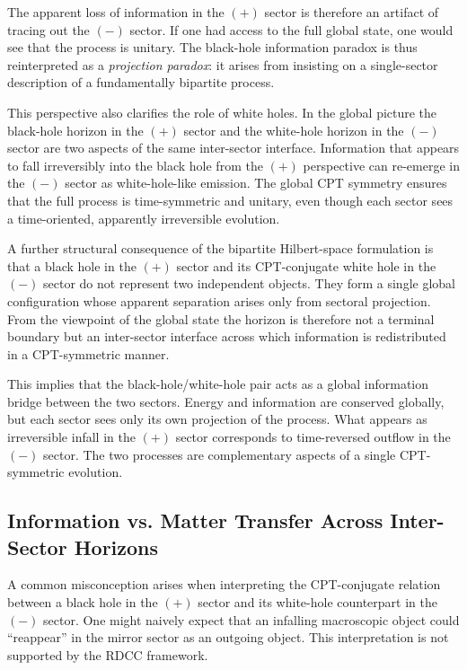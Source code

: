 \documentclass[11pt,a4paper]{article}
\begin{document}
The apparent loss of information in the $(+)$ sector is therefore an artifact of tracing out
the $(-)$ sector. If one had access to the full global state, one would see that the process
is unitary. The black-hole information paradox is thus reinterpreted as a \emph{projection
paradox}: it arises from insisting on a single-sector description of a fundamentally
bipartite process.

This perspective also clarifies the role of white holes. In the global picture the black-hole
horizon in the $(+)$ sector and the white-hole horizon in the $(-)$ sector are two aspects
of the same inter-sector interface. Information that appears to fall irreversibly into the
black hole from the $(+)$ perspective can re-emerge in the $(-)$ sector as white-hole-like
emission. The global CPT symmetry ensures that the full process is time-symmetric and
unitary, even though each sector sees a time-oriented, apparently irreversible evolution.

A further structural consequence of the bipartite Hilbert-space formulation is that a black
hole in the $(+)$ sector and its CPT-conjugate white hole in the $(-)$ sector do not
represent two independent objects. They form a single global configuration whose
apparent separation arises only from sectoral projection. From the viewpoint of the
global state the horizon is therefore not a terminal boundary but an inter-sector interface
across which information is redistributed in a CPT-symmetric manner.

This implies that the black-hole/white-hole pair acts as a global information bridge
between the two sectors. Energy and information are conserved globally, but each sector
sees only its own projection of the process. What appears as irreversible infall in the $(+)$
sector corresponds to time-reversed outflow in the $(-)$ sector. The two processes are
complementary aspects of a single CPT-symmetric evolution.


\subsection{Information vs. Matter Transfer Across Inter-Sector Horizons}

A common misconception arises when interpreting the CPT-conjugate relation between a
black hole in the $(+)$ sector and its white-hole counterpart in the $(-)$ sector. One might
naively expect that an infalling macroscopic object could ``reappear'' in the mirror sector
as an outgoing object. This interpretation is not supported by the RDCC framework.
\end{document}
